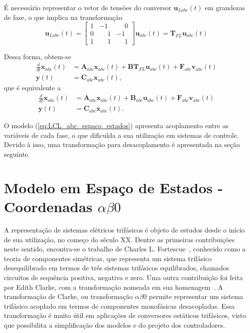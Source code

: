   É necessário representar o vetor de tensões do conversor $\mathbf{u}_{Labc}(t)$ em grandezas de fase, o que implica na transformação
  \begin{equation}
    \mathbf{u}_{Labc}(t) = \left[
      \begin{array}{ccc}
        1 &           -1 & \phantom{-}0 \\[0.3em]
        0 & \phantom{-}1 &           -1 \\[0.3em]
        1 & \phantom{-}1 & \phantom{-}1
      \end{array}
    \right] \mathbf{u}_{abc}(t) = \mathbf{T}_{FL} \mathbf{u}_{abc}(t)
  \end{equation}

  Dessa forma, obtem-se
  \begin{equation}
    \begin{split}
      \frac{d}{dt} \mathbf{x}_{abc}(t) & = \mathbf{A}_{abc} \mathbf{x}_{abc}(t) +
        \mathbf{BT}_{FL} \mathbf{u}_{abc}(t) + \mathbf{F}_{abc} \mathbf{v}_{abc}(t) \\
      \mathbf{y}(t) & = \mathbf{C}_{abc} \mathbf{x}_{abc}(t) \text{,}
    \end{split}
  \end{equation}
  que é equivalente a
  \begin{equation}
    \begin{split}
      \frac{d}{dt} \mathbf{x}_{abc}(t) & = \mathbf{A}_{abc} \mathbf{x}_{abc}(t) +
        \mathbf{B}_{abc} \mathbf{u}_{abc}(t) + \mathbf{F}_{abc} \mathbf{v}_{abc}(t) \\
        \mathbf{y}(t) & = \mathbf{C}_{abc} \mathbf{x}_{abc}(t) \text{.}
    \end{split}
    \label{eq:LCL_abc_espaco_estados}
  \end{equation}

  O modelo (\ref{eq:LCL_abc_espaco_estados}) apresenta acoplamento entre as variáveis de cada fase, o que dificulda a sua utilização em sistemas de controle. Devido à isso, uma transformação para desacoplamento é apresentada na seção seguinte.

\section{Modelo em Espaço de Estados - Coordenadas $\alpha \beta 0$}

  A representação de sistemas elétricos trifásicos é objeto de estudos desde o início de sua utilização, no começo do século XX. Dentre as primeiras contribuições neste sentido, encontra-se o trabalho de Charles L. Fortescue~\cite{ref:FORTESCUE}, conhecido como a teoria de componentes simétricas, que representa um sistema trifásico desequilibrado em termos de três sistemas trifásicos equilibrados, chamados circuitos de sequência positiva, negativa e zero. Uma outra contribuição foi feita por Edith Clarke, com a transformação nomeada em sua homenagem~\cite{ref:CLARKE}. A transformação de Clarke, ou transformação $\alpha \beta 0$ permite representar um sistema trifásico acoplado em termos de componentes monofásicas desacopladas. Essa transformação é muito útil em aplicações de conversores estáticos trifásicos, visto que possibilita a simplificação dos modelos e do projeto dos controladores.

